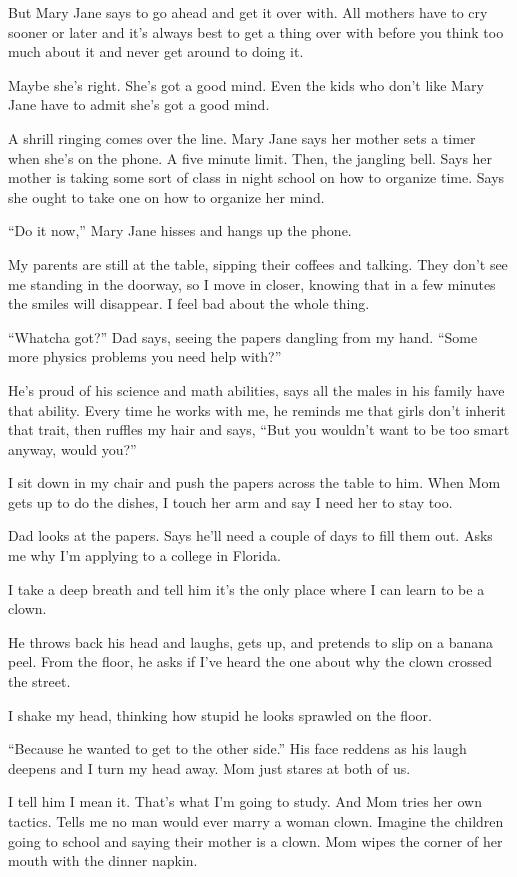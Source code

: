 \documentclass[
]{article}
\begin{document}
But Mary Jane says to go ahead and get it over with. All mothers have to
cry sooner or later and it's always best to get a thing over with before
you think too much about it and never get around to doing it.

Maybe she's right. She's got a good mind. Even the kids who don't like
Mary Jane have to admit she's got a good mind.

A shrill ringing comes over the line. Mary Jane says her mother sets a
timer when she's on the phone. A five minute limit. Then, the jangling
bell. Says her mother is taking some sort of class in night school on
how to organize time. Says she ought to take one on how to organize her
mind.

``Do it now,'' Mary Jane hisses and hangs up the phone.

My parents are still at the table, sipping their coffees and talking.
They don't see me standing in the doorway, so I move in closer, knowing
that in a few minutes the smiles will disappear. I feel bad about the
whole thing.

``Whatcha got?'' Dad says, seeing the papers dangling from my hand.
``Some more physics problems you need help with?''

He's proud of his science and math abilities, says all the males in his
family have that ability. Every time he works with me, he reminds me
that girls don't inherit that trait, then ruffles my hair and says,
``But you wouldn't want to be too smart anyway, would you?''

I sit down in my chair and push the papers across the table to him. When
Mom gets up to do the dishes, I touch her arm and say I need her to stay
too.

Dad looks at the papers. Says he'll need a couple of days to fill them
out. Asks me why I'm applying to a college in Florida.

I take a deep breath and tell him it's the only place where I can learn
to be a clown.

He throws back his head and laughs, gets up, and pretends to slip on a
banana peel. From the floor, he asks if I've heard the one about why the
clown crossed the street.

I shake my head, thinking how stupid he looks sprawled on the floor.

``Because he wanted to get to the other side.'' His face reddens as his
laugh deepens and I turn my head away. Mom just stares at both of us.

I tell him I mean it. That's what I'm going to study. And Mom tries her
own tactics. Tells me no man would ever marry a woman clown. Imagine the
children going to school and saying their mother is a clown. Mom wipes
the corner of her mouth with the dinner napkin.
\end{document}

